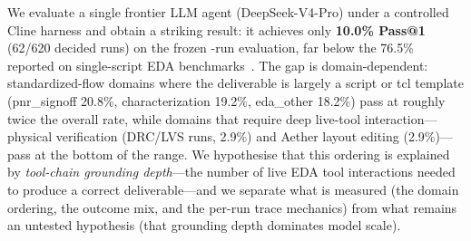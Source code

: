 We evaluate a single frontier LLM agent (DeepSeek-V4-Pro) under a controlled Cline harness and obtain a striking result: it achieves only \textbf{10.0\% Pass@1} (62/620 decided runs) on the frozen \Neval{}-run evaluation, far below the 76.5\% reported on single-script EDA benchmarks~\cite{zhu2026edascript}. The gap is domain-dependent: standardized-flow domains where the deliverable is largely a script or tcl template (pnr\_signoff 20.8\%, characterization 19.2\%, eda\_other 18.2\%) pass at roughly twice the overall rate, while domains that require deep live-tool interaction---physical verification (DRC/LVS runs, 2.9\%) and Aether layout editing (2.9\%)---pass at the bottom of the range. We hypothesise that this ordering is explained by \emph{tool-chain grounding depth}---the number of live EDA tool interactions needed to produce a correct deliverable---and we separate what is measured (the domain ordering, the outcome mix, and the per-run trace mechanics) from what remains an untested hypothesis (that grounding depth dominates model scale).

